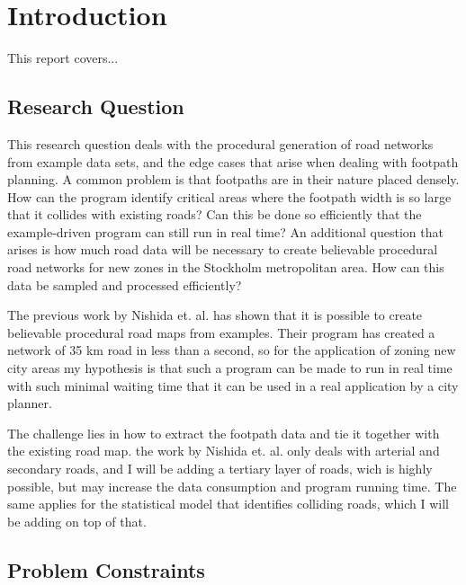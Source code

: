 \documentclass[a4paper]{article}
\begin{document}
\section{Introduction}

This report covers... \cite{sampleitem2}

\subsection{Research Question}

This research question deals with the procedural generation of road networks from example data sets, and the edge cases that arise when dealing with footpath planning. A common problem is that footpaths are in their nature placed densely. How can the program identify critical areas where the footpath width is so large that it collides with existing roads? Can this be done so efficiently that the example-driven program can still run in real time? An additional question that arises is how much road data will be necessary to create believable procedural road networks for new zones in the Stockholm metropolitan area. How can this data be sampled and processed efficiently?

The previous work by Nishida et. al. has shown that it is possible to create believable procedural road maps from examples. Their program has created a network of 35 km road in less than a second, so for the application of zoning new city areas my hypothesis is that such a program can be made to run in real time with such minimal waiting time that it can be used in a real application by a city planner.

The challenge lies in how to extract the footpath data and tie it together with the existing road map. the work by Nishida et. al. only deals with arterial and secondary roads, and I will be adding a tertiary layer of roads, wich is highly possible, but may increase the data consumption and program running time. The same applies for the statistical model that identifies colliding roads, which I will be adding on top of that.

\subsection{Problem Constraints}
\end{document}
